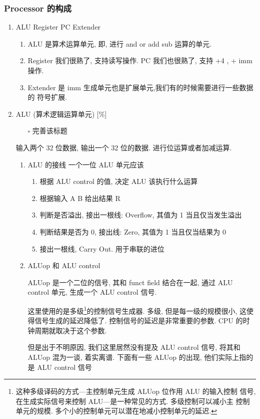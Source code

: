 \documentclass[11pt]{ctexart}
\begin{document}
\subsubsection{Processor 的构成}
\label{sec:org36075f9}
\begin{enumerate}
\item ALU Register PC Extender
\label{sec:org7496264}
\begin{enumerate}
\item ALU 是算术运算单元, 即, 进行 and or add sub 运算的单元.
\item Register 我们很熟了, 支持读写操作. PC 我们也很熟了, 支持 +4 , + imm
操作.
\item Extender 是 imm 生成单元也是扩展单元,我们有的时候需要进行一些数据的
符号扩展.
\end{enumerate}
\item ALU (算术逻辑运算单元) [\%]
\label{sec:org60e55dd}
\begin{itemize}
\item[{$\square$}] 完善该标题
\end{itemize}
输入两个 32 位数据, 输出一个 32 位的数据. 进行位运算或者加减运算. 
\begin{enumerate}
\item ALU 的接线
\label{sec:org3c38832}
一个一位 ALU 单元应该
\begin{enumerate}
\item 根据 ALU control 的值, 决定 ALU 该执行什么运算
\item 根据输入 A B 给出结果 R
\item 判断是否溢出, 接出一根线: Overflow, 其值为 1 当且仅当发生溢出
\item 判断结果是否为 0, 接出线: Zero, 其值为 1 当且仅当结果为 0
\item 接出一根线, Carry Out. 用于串联的进位
\end{enumerate}
\item ALUop 和 ALU control
\label{sec:org6c9fed4}

ALUop 是一个二位的信号, 其和 funct field 结合在一起, 通过 ALU 
control 单元, 生成一个 ALU control 信号. 

这里使用的是多级\footnote{这种多级译码的方式---主控制单元生成 ALUop 位作用 ALU 的输入控制
信号, 在生成实际信号来控制 ALU---是一种常见的方式. 多级控制可以减小主
控制单元的规模. 多个小的控制单元可以潜在地减小控制单元的延迟.}的控制信号生成器. 多级, 但是每一级的规模很小, 这使得信号生成的延迟降低了. 控制信号的延迟是非常重要的参数. CPU 的时钟周期就取决于这个参数. 

但是出于不明原因, 我们这里居然没有提及 ALU control 信号, 将其和 ALUop
混为一谈, 着实离谱. 下面有一些 ALUop 的出现, 他们实际上指的是 ALU
control 信号


\end{enumerate}
\end{enumerate}
\end{document}
